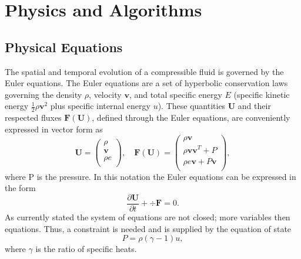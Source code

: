 \section{Physics and Algorithms}
\subsection{Physical Equations}
\label{sec.physical_eq}
The spatial and temporal evolution of a compressible fluid is governed by the
Euler equations. The Euler equations are a set of hyperbolic conservation laws
governing the density $\rho$, velocity $\mathbf{v}$, and total specific energy
$E$ (specific kinetic energy $\frac{1}{2}\rho \mathbf{v}^2$ plus specific internal
energy $u$). These quantities $\mathbf{U}$ and their respected fluxes
$\mathbf{F}(\mathbf{U})$, defined through the Euler equations, are conveniently
expressed in vector form as
%
\begin{equation}
    \mathbf{U} =
    \left(
    \begin{array}{c}
        \rho \\
        \mathbf{v} \\
        \rho e \\
    \end{array} \right),
    \quad
    \mathbf{F}(\mathbf{U}) =
    \left(
    \begin{array}{c}
        \rho\mathbf{v} \\
        \rho\mathbf{v}\mathbf{v}^T + P \\
        \rho e\mathbf{v} + P\mathbf{v} \\
    \end{array}
    \right),
\end{equation}
%
where P is the pressure. In this notation the Euler equations can be expressed
in the form
%
\begin{equation}
    \label{eq.euler}
    \frac{\partial \mathbf{U}}{\partial t} + \div \mathbf{F} = 0.
\end{equation}
%
As currently stated the system of equations are not closed; more variables then
equations. Thus, a constraint is needed and is supplied by the equation of state
%
\begin{equation}
    P = \rho(\gamma - 1)u,
\end{equation}
%
where $\gamma$ is the ratio of specific heats.

